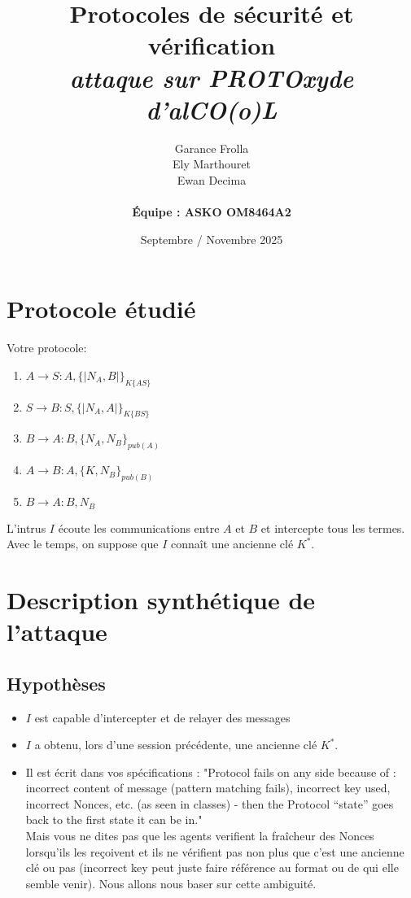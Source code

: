 \documentclass[11pt]{article}
\begin{document}
\title{\textbf{Protocoles de sécurité et vérification} \\
{\small \textit{attaque sur PROTOxyde d'alCO(o)L}}}

\author{Garance Frolla \\ Ely Marthouret \\ Ewan Decima \\\\ \textbf{Équipe : ASKO OM8464A2}}
\date{Septembre / Novembre 2025}

\maketitle
\tableofcontents
\newpage

\section{Protocole étudié}

Votre protocole:

\begin{enumerate}
    \item $A \rightarrow S : A, \{|N_A,B|\}_{K\{AS\}}$
    \item $S \rightarrow B : S, \{|N_A,A|\}_{K\{BS\}}$
    \item $B \rightarrow A : B, \{N_A,N_B\}_{pub(A)}$
    \item $A \rightarrow B : A, \{K,N_B\}_{pub(B)}$
    \item $B \rightarrow A : B,N_B$
\end{enumerate}

\bigskip
\noindent
L'intrus $I$ écoute les communications entre $A$ et $B$ et intercepte tous les termes. Avec le temps, on suppose que $I$ connaît une ancienne clé $K^*$.

\section{Description synthétique de l'attaque}

\subsection{Hypothèses}
\begin{itemize}
    \item $I$ est capable d'intercepter et de relayer des messages 
    \item $I$ a obtenu, lors d'une session précédente, une ancienne clé $K^*$.
    \item Il est écrit dans vos spécifications :  "Protocol fails on any side because of : incorrect content of message (pattern matching fails), incorrect key used, incorrect Nonces, etc. (as seen in classes) - then the Protocol “state” goes back to the first state it can be in." \\ 
    Mais vous ne dites pas que les agents verifient la fraîcheur des Nonces lorsqu'ils les reçoivent et ils ne vérifient pas non plus que c'est une ancienne clé ou pas (incorrect key peut juste faire référence au format ou de qui elle semble venir). Nous allons nous baser sur cette ambiguité.

\end{itemize}
\end{document}
